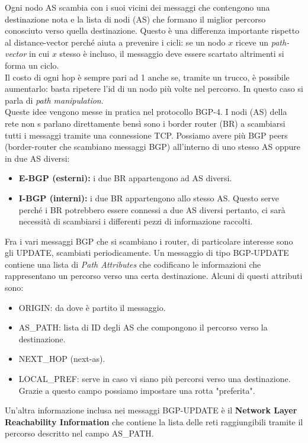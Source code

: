 \documentclass{article}
\begin{document}
Ogni nodo AS scambia con i suoi vicini dei messaggi che contengono una destinazione nota e la lista di nodi (AS) che formano il miglior percorso conosciuto verso quella destinazione. Questo è una differenza importante rispetto al distance-vector perché aiuta a prevenire i cicli: se un nodo \(x\) riceve un \textit{path-vector} in cui \(x\) stesso è incluso, il messaggio deve essere scartato altrimenti si forma un ciclo.\\
Il costo di ogni hop è sempre pari ad 1 anche se, tramite un trucco, è possibile aumentarlo: basta ripetere l'id di un nodo più volte nel percorso. In questo caso si parla di \textit{path manipulation}.\\
Queste idee vengono messe in pratica nel protocollo BGP-4. I nodi (AS) della rete non s parlano direttamente bensì sono i border router (BR) a scambiarsi tutti i messaggi tramite una connessione TCP. Possiamo avere più BGP peers (border-router che scambiano messaggi BGP) all'interno di uno stesso AS oppure in due AS diversi:
\begin{itemize}
    \item \textbf{E-BGP (esterni):} i due BR appartengono ad AS diversi.
    \item \textbf{I-BGP (interni):} i due BR appartengono allo stesso AS. Questo serve perché i BR potrebbero essere connessi a due AS diversi pertanto, ci sarà necessità di scambiarsi i differenti pezzi di informazione raccolti.
\end{itemize}
Fra i vari messaggi BGP che si scambiano i router, di particolare interesse sono gli UPDATE, scambiati periodicamente. Un messaggio di tipo BGP-UPDATE contiene una lista di \textit{Path Attributes} che codificano le informazioni che rappresentano un percorso verso una certa destinazione. Alcuni di questi attributi sono:
\begin{itemize}
    \item ORIGIN: da dove è partito il messaggio.
    \item AS\_PATH: lista di ID degli AS che compongono il percorso verso la destinazione.
    \item NEXT\_HOP (next-as).
    \item LOCAL\_PREF: serve in caso vi siano più percorsi verso una destinazione. Grazie a questo campo possiamo impostare una rotta "preferita".
\end{itemize}
Un'altra informazione inclusa nei messaggi BGP-UPDATE è il \textbf{Network Layer Reachability Information} che contiene la lista delle reti raggiungibili tramite il percorso descritto nel campo AS\_PATH.
\end{document}
